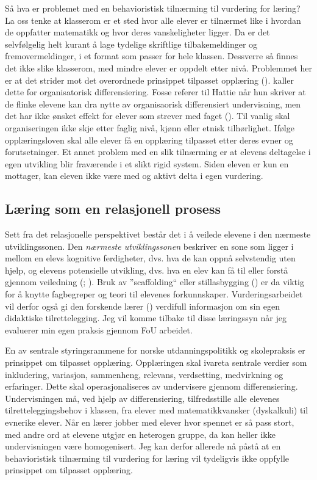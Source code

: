 \documentclass[main.tex]{subfiles}
\begin{document}
Så hva er problemet med en behavioristisk tilnærming til vurdering for læring? La oss tenke at klasserom er 
et sted hvor alle elever er tilnærmet like i hvordan de oppfatter matematikk og hvor deres vanskeligheter ligger. 
Da er det selvfølgelig helt kurant å lage tydelige skriftlige tilbakemeldinger og fremovermeldinger, i et format 
som passer for hele klassen. Dessverre så finnes det ikke slike klasserom, med mindre elever er oppdelt etter nivå. 
Problemmet her er at det strider mot det overordnede prinsippet tilpasset opplæring (). 
 kaller dette for organisatorisk differensiering. Fosse referer til Hattie når hun skriver at de flinke 
elevene kan dra nytte av organisaorisk differensiert undervisning, men det har ikke ønsket effekt for elever som strever 
med faget (). Til vanlig skal organiseringen ikke skje etter
faglig nivå, kjønn eller etnisk tilhørlighet. Ifølge opplæringsloven skal alle elever få en opplæring tilpasset 
etter deres evner og forutsetninger. Et annet problem med en slik tilnærming er at elevens deltagelse i egen utvikling 
blir fraværende i et slikt rigid system. Siden eleven er kun en mottager, kan eleven ikke være med og aktivt delta i 
egen vurdering. 

\subsection*{Læring som en relasjonell prosess}

Sett fra det relasjonelle perspektivet består det i å veilede elevene i den nærmeste utviklingssonen.
Den \emph{nærmeste utviklingssonen} beskriver en sone som ligger i mellom en elevs kognitive 
ferdigheter, dvs. hva de kan oppnå selvstendig uten hjelp, og elevens potensielle utvikling, dvs. 
hva en elev kan få til eller forstå gjennom veiledning (; ). 
Bruk av ''scaffolding`` eller stillasbygging () er da viktig for å knytte fagbegreper og teori til elevenes 
forkunnskaper. Vurderingsarbeidet vil derfor også gi den forskende lærer () verdifull informasjon 
om sin egen didaktiske tilrettelegging.
Jeg vil komme tilbake til disse læringssyn når jeg evaluerer min egen praksis gjennom FoU arbeidet.
\newline

En av sentrale styringsrammene for norske utdanningspolitikk og skolepraksis er prinsippet om tilpasset opplæring.
Opplæringen skal ivareta sentrale verdier som inkludering, variasjon, sammenheng, relevans, verdsetting, medvirkning og 
erfaringer. Dette skal operasjonaliseres av undervisere gjennom differensiering.  Undervisningen må, ved hjelp av 
differensiering, tilfredsstille alle elevenes tilretteleggingsbehov i klassen, fra elever med matematikkvansker 
(dyskalkuli) til evnerike elever. Når en lærer jobber med elever hvor spennet er så pass stort, med andre ord at elevene 
utgjør en heterogen gruppe, da kan heller ikke undervisningen være homogenisert. Jeg kan derfor allerede nå påstå at en 
behavioristisk tilnærming til vurdering for læring vil tydeligvis ikke oppfylle prinsippet om tilpasset opplæring.
\end{document}
